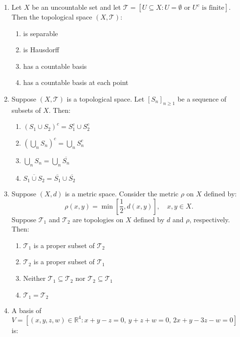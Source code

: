 \documentclass[journal]{IEEEtran}
\newcommand{\brak}[1]{\left( #1 \right)}
\newcommand{\sbrak}[1]{\left[ #1 \right]}
\begin{document}
\begin{enumerate}
  \item Let $X$ be an uncountable set and let $\mathscr{T} = \sbrak{ U \subseteq X : U = \emptyset \text{ or } U^c \text{ is finite} }$. Then the topological space $\brak{X, \mathscr{T}}$:

    \begin{enumerate}
        \item is separable
        \item is Hausdorff
        \item has a countable basis
        \item has a countable basis at each point
    \end{enumerate}

  \item Suppose $\brak{X, \mathscr{T}}$ is a topological space. Let $\sbrak{S_n}_{n \geq 1}$ be a sequence of subsets of $X$. Then:

     \begin{enumerate}
        \item $\brak{S_1 \cup S_2}^c = S_1^c \cup S_2^c$
        \item $\brak{ \bigcup_n S_n }^c = \bigcup_n S_n^c$
        \item $\bigcup_n S_n = \bigcup_n \overline{S_n}$
        \item $\overline{S_1 \cup S_2} = \overline{S_1} \cup \overline{S_2}$
    \end{enumerate}
  
  \item Suppose $\brak{X, d}$ is a metric space. Consider the metric $\rho$ on $X$ defined by:
    \[
    \rho\brak{x, y} = \min\sbrak{ \frac{1}{2}, d\brak{x, y} }, \quad x, y \in X.
    \]
    Suppose $\mathscr{T}_1$ and $\mathscr{T}_2$ are topologies on $X$ defined by $d$ and $\rho$, respectively. Then:

    \begin{enumerate}
        \item $\mathscr{T}_1$ is a proper subset of $\mathscr{T}_2$
        \item $\mathscr{T}_2$ is a proper subset of $\mathscr{T}_1$
        \item Neither $\mathscr{T}_1 \subseteq \mathscr{T}_2$ nor $\mathscr{T}_2 \subseteq \mathscr{T}_1$
        \item $\mathscr{T}_1 = \mathscr{T}_2$
    \end{enumerate}

  \item A basis of $V = \sbrak{\brak{x, y, z, w} \in \mathbb{R}^4 : x + y - z = 0, \, y + z + w = 0, \, 2x + y - 3z - w = 0 }$ is:


\end{enumerate}
\end{document}
